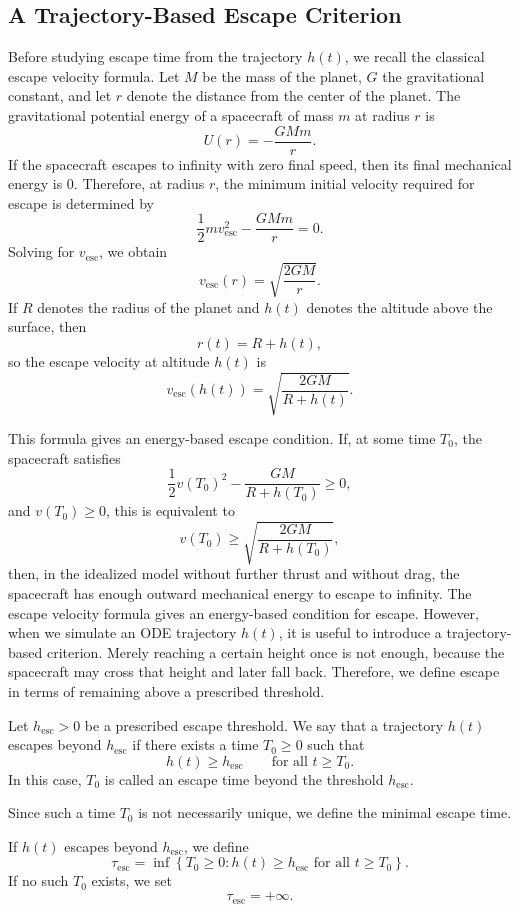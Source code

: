 \subsection{A Trajectory-Based Escape Criterion}
Before studying escape time from the trajectory $h(t)$, we recall the classical escape velocity formula. 
Let $M$ be the mass of the planet, $G$ the gravitational constant, and let $r$ denote the distance from the center of the planet. 
The gravitational potential energy of a spacecraft of mass $m$ at radius $r$ is
\[
    U(r)=-\frac{GMm}{r}.
\]
If the spacecraft escapes to infinity with zero final speed, then its final mechanical energy is $0$. 
Therefore, at radius $r$, the minimum initial velocity required for escape is determined by
\[
    \frac12 m v_{\mathrm{esc}}^2-\frac{GMm}{r}=0.
\]
Solving for $v_{\mathrm{esc}}$, we obtain
\[
    \boxed{ v_{\mathrm{esc}}(r) = \sqrt{\frac{2GM}{r}}. }
\]
If $R$ denotes the radius of the planet and $h(t)$ denotes the altitude above the surface, then
\[
    r(t)=R+h(t),
\]
so the escape velocity at altitude $h(t)$ is
\[
    v_{\mathrm{esc}}(h(t)) = \sqrt{\frac{2GM}{R+h(t)}}.
\]

This formula gives an energy-based escape condition. 
If, at some time $T_0$, the spacecraft satisfies
\[
    \frac12 v(T_0)^2-\frac{GM}{R+h(T_0)}\geq 0,
\]
and $v(T_0)\ge0$, this is equivalent to
\[
    v(T_0)\geq \sqrt{\frac{2GM}{R+h(T_0)}},
\]
then, in the idealized model without further thrust and without drag, the spacecraft has enough outward mechanical energy to escape to infinity.
The escape velocity formula gives an energy-based condition for escape. 
However, when we simulate an ODE trajectory $h(t)$, it is useful to introduce a trajectory-based criterion. 
Merely reaching a certain height once is not enough, because the spacecraft may cross that height and later fall back. 
Therefore, we define escape in terms of remaining above a prescribed threshold.

\begin{definition}
Let $h_{\mathrm{esc}}>0$ be a prescribed escape threshold. 
We say that a trajectory $h(t)$ escapes beyond $h_{\mathrm{esc}}$ if there exists a time $T_0\ge 0$ such that
\[
    h(t)\ge h_{\mathrm{esc}} \qquad \text{for all } t\ge T_0.
\]
In this case, $T_0$ is called an escape time beyond the threshold $h_{\mathrm{esc}}$.
\end{definition}
Since such a time $T_0$ is not necessarily unique, we define the minimal escape time.
\begin{definition}
If $h(t)$ escapes beyond $h_{\mathrm{esc}}$, we define
\[
    \tau_{\mathrm{esc}} = \inf \left\{ T_0\ge 0: h(t)\ge h_{\mathrm{esc}} \text{ for all } t\ge T_0 \right\}.
\]
If no such $T_0$ exists, we set
\[
    \tau_{\mathrm{esc}}=+\infty.
\]
\end{definition}

